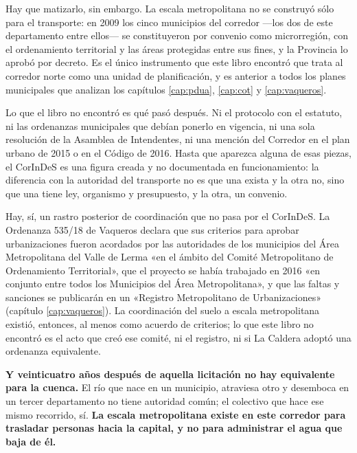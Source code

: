 \begin{cautela}
Hay que matizarlo, sin embargo. La escala metropolitana no se construyó sólo para el transporte: en 2009 los cinco municipios del corredor ---los dos de este departamento entre ellos--- se constituyeron por convenio como microrregión, con el ordenamiento territorial y las áreas protegidas entre sus fines, y la Provincia lo aprobó por decreto. Es el único instrumento que este libro encontró que trata al corredor norte como una unidad de planificación, y es anterior a todos los planes municipales que analizan los capítulos \ref{cap:pdua}, \ref{cap:cot} y \ref{cap:vaqueros}.

Lo que el libro no encontró es qué pasó después. Ni el protocolo con el estatuto, ni las ordenanzas municipales que debían ponerlo en vigencia, ni una sola resolución de la Asamblea de Intendentes, ni una mención del Corredor en el plan urbano de 2015 o en el Código de 2016. Hasta que aparezca alguna de esas piezas, el CorInDeS es una figura creada y no documentada en funcionamiento: la diferencia con la autoridad del transporte no es que una exista y la otra no, sino que una tiene ley, organismo y presupuesto, y la otra, un convenio. 

Hay, sí, un rastro posterior de coordinación que no pasa por el CorInDeS. La Ordenanza 535/18 de Vaqueros declara que sus criterios para aprobar urbanizaciones fueron acordados por las autoridades de los municipios del Área Metropolitana del Valle de Lerma «en el ámbito del Comité Metropolitano de Ordenamiento Territorial», que el proyecto se había trabajado en 2016 «en conjunto entre todos los Municipios del Área Metropolitana», y que las faltas y sanciones se publicarán en un «Registro Metropolitano de Urbanizaciones» (capítulo \ref{cap:vaqueros}). La coordinación del suelo a escala metropolitana existió, entonces, al menos como acuerdo de criterios; lo que este libro no encontró es el acto que creó ese comité, ni el registro, ni si La Caldera adoptó una ordenanza equivalente. 
\end{cautela}

\textbf{Y veinticuatro años después de aquella licitación no hay equivalente para la cuenca.} El río que nace en un
municipio, atraviesa otro y desemboca en un tercer departamento no tiene autoridad común; el
colectivo que hace ese mismo recorrido, sí. \textbf{La escala metropolitana existe en este
corredor para trasladar personas hacia la capital, y no para administrar el agua que baja de
él.}

